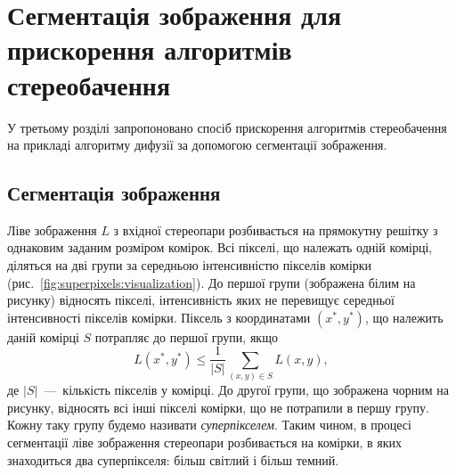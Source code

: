 \chapter{Сегментація зображення для прискорення алгоритмів стереобачення}

У третьому розділі запропоновано спосіб прискорення алгоритмів стереобачення
на прикладі алгоритму дифузії за допомогою сегментації зображення.

\section{Сегментація зображення}

Ліве зображення $L$ з вхідної стереопари
розбивається на прямокутну решітку з однаковим заданим розміром комірок.
Всі пікселі, що належать одній комірці,
діляться на дві групи за середньою інтенсивністю пікселів комірки
(рис.~\ref{fig:superpixels:visualization}).
До першої групи (зображена білим на рисунку) відносять пікселі,
інтенсивність яких не перевищує середньої інтенсивності пікселів комірки.
Піксель з координатами $\left(x^*, y^* \right)$, що належить даній комірці $S$
потрапляє до першої групи, якщо
\begin{equation*}
    L \left(x^*, y^* \right) \le
        \frac{1}{ \left| S \right| }
        \sum \limits_{\left(x, y \right) \in S} L \left(x, y \right),
\end{equation*}
де $ \left| S \right|$~---~кількість пікселів у комірці.
До другої групи, що зображена чорним на рисунку,
відносять всі інші пікселі комірки, що не потрапили в першу групу.
Кожну таку групу будемо називати \textit{суперпікселем}.
Таким чином, в процесі сегментації ліве зображення
стереопари розбивається на комірки, в яких знаходиться два суперпікселя:
більш світлий і більш темний.

